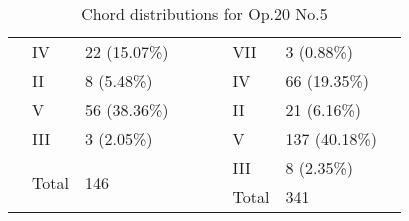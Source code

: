 \begin{table}[]
{\begin{tabular}{|l|l|l|l|l|l|l|l|l|}
 & IV & 22 (15.07\%) &  &  &  & VII & 3 (0.88\%) &  \\ \cline{2-3} \cline{7-8}
 & II & 8 (5.48\%) &  &  &  & IV & 66 (19.35\%) &  \\ \cline{2-3} \cline{7-8}
 & V & 56 (38.36\%) &  &  &  & II & 21 (6.16\%) &  \\ \cline{2-3} \cline{7-8}
 & III & 3 (2.05\%) &  &  &  & V & 137 (40.18\%) &  \\ \cline{2-3} \cline{7-8}
 & \multirow{2}{*}{Total} & \multirow{2}{*}{146} &  &  &  & III & 8 (2.35\%) &  \\ \cline{7-8}
 &  &  &  &  &  & Total & 341 &  \\ \cline{1-4} \cline{6-9}
\end{tabular}
}
\caption{Chord distributions for Op.20 No.5}
\label{table:chords_op20n5}
\end{table}


\newpage
